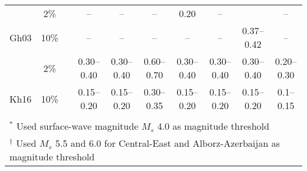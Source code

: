 \begin{table*}[t]
\begin{tabular}{lccccccccc}
            &   2\%  &&   --        &   --        &   --        &   0.20      &   --        &             &   --        \\
    Gh03    &  10\%  &&   --        &   --        &   --        &   --        &   --        & 0.37--0.42  &   --        \\
                 &  2\%  &&  0.30--0.40   & 0.30--0.40  & 0.60--0.70  & 0.30--0.40  & 0.30--0.40  & 0.30--0.40  & 0.20--0.30  \\
     Kh16    & 10\% &&  0.15--0.20   & 0.15--0.20  & 0.30--0.35  & 0.15--0.20  & 0.15--0.20  & 0.15--0.20  & 0.1--0.15    \\[0.6ex]
    \hline                                                                                                              \\[-1.6ex]
    \multicolumn{10}{l}{\small{${}^{*}$ Used surface-wave magnitude $M_s$ 4.0 as magnitude threshold}}                  \\
    \multicolumn{10}{l}{\small{${}^{\dagger}$ Used $M_s$ 5.5 and 6.0 for Central-East and Alborz-Azerbaijan as magnitude threshold}}    
\end{tabular}
\label{tab:pga} 
\end{table*}
